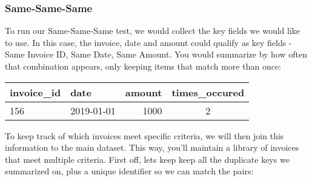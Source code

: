 \documentclass[
]{book}
\newenvironment{Shaded}{\begin{snugshade}}{\end{snugshade}}
\newcommand{\CommentTok}[1]{\textcolor[rgb]{0.56,0.35,0.01}{\textit{#1}}}
\newcommand{\DataTypeTok}[1]{\textcolor[rgb]{0.13,0.29,0.53}{#1}}
\newcommand{\DecValTok}[1]{\textcolor[rgb]{0.00,0.00,0.81}{#1}}
\newcommand{\KeywordTok}[1]{\textcolor[rgb]{0.13,0.29,0.53}{\textbf{#1}}}
\newcommand{\NormalTok}[1]{#1}
\newcommand{\OperatorTok}[1]{\textcolor[rgb]{0.81,0.36,0.00}{\textbf{#1}}}
\newcommand{\StringTok}[1]{\textcolor[rgb]{0.31,0.60,0.02}{#1}}
\begin{document}
\hypertarget{same-same-same}{%
\subsubsection{Same-Same-Same}\label{same-same-same}}

To run our Same-Same-Same test, we would collect the key fields we would like to use. In this case, the invoice, date and amount could qualify as key fields - Same Invoice ID, Same Date, Same Amount. You would summarize by how often that combination appears, only keeping items that match more than once:

\begin{Shaded}
\end{Shaded}

\captionsetup[table]{labelformat=empty,skip=1pt}
\begin{longtable}{llrc}
\toprule
invoice\_id & date & amount & times\_occured \\ 
\midrule
156 & 2019-01-01 & 1000 & 2 \\ 
\bottomrule
\end{longtable}

To keep track of which invoices meet specific criteria, we will then join this information to the main dataset. This way, you'll maintain a library of invoices that meet multiple criteria. First off, lets keep keep all the duplicate keys we summarized on, plus a unique identifier so we can match the pairs:

\begin{Shaded}
\end{Shaded}
\end{document}
